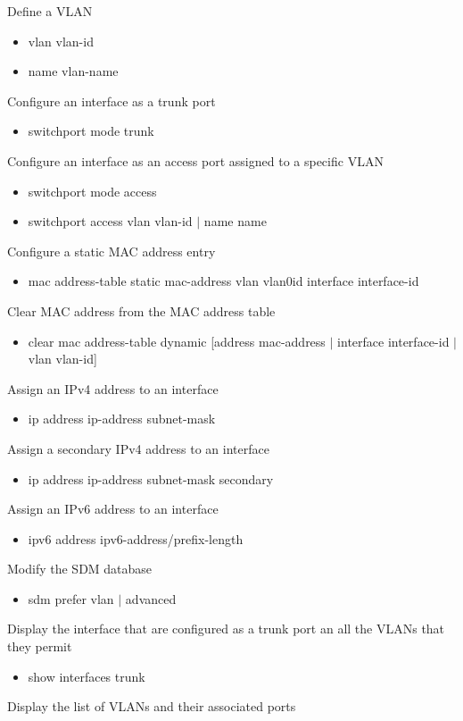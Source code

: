 \documentclass{article}
\begin{document}
\noindent Define a VLAN
\begin{itemize}
\item vlan vlan-id
\item name vlan-name
\end{itemize}
Configure an interface as a trunk port
\begin{itemize}
\item switchport mode trunk
\end{itemize}
Configure an interface as an access port assigned to a specific VLAN
\begin{itemize}
\item switchport mode access
\item switchport access vlan {vlan-id $|$ name name}
\end{itemize}
Configure a static MAC address entry
\begin{itemize}
\item mac address-table static mac-address vlan vlan0id interface interface-id
\end{itemize}
Clear MAC address from the MAC address table
\begin{itemize}
\item clear mac address-table dynamic [{address mac-address $|$ interface interface-id  $|$ vlan vlan-id}]
\end{itemize}
Assign an IPv4 address to an interface
\begin{itemize}
\item ip address ip-address subnet-mask
\end{itemize}
Assign a secondary IPv4 address to an interface
\begin{itemize}
\item ip address ip-address subnet-mask secondary
\end{itemize}
Assign an IPv6 address to an interface
\begin{itemize}
\item ipv6 address ipv6-address/prefix-length
\end{itemize}
Modify the SDM database
\begin{itemize}
\item sdm prefer {vlan $|$ advanced}
\end{itemize}
Display the interface that are configured as a trunk port an all the VLANs that they permit
\begin{itemize}
\item show interfaces trunk
\end{itemize}
Display the list of VLANs and their associated ports
\end{document}
